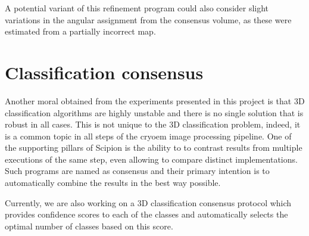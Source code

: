 \documentclass[../main.tex]{subfiles}
\begin{document}
A potential variant of this refinement program could also consider slight variations in the angular assignment from the consensus volume, as these were estimated from a partially incorrect map. 

\section{Classification consensus}
Another moral obtained from the experiments presented in this project is that 3D classification algorithms are highly unstable and there is no single solution that is robust in all cases. This is not unique to the 3D classification problem, indeed, it is a common topic in all steps of the \gls{cryoem} image processing pipeline. One of the supporting pillars of Scipion is the ability to to contrast results from multiple executions of the same step, even allowing to compare distinct implementations. Such programs are named as consensus and their primary intention is to automatically combine the results in the best way possible.

Currently, we are also working on a 3D classification consensus protocol which provides confidence scores to each of the classes and automatically selects the optimal number of classes based on this score.
\end{document}
